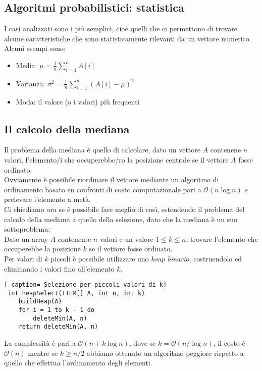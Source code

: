\documentclass[../cheatSheetAlgoritmi.tex]{subfiles}
\begin{document}
\subsection{Algoritmi probabilistici: statistica}
I casi analizzati sono i più semplici, cioè quelli che ci permettono di trovare alcune caratteristiche che sono statisticamente rilevanti da un vettore numerico. \\
Alcuni esempi sono:
\begin{itemize}
	\item Media: $\mu = \frac{1}{n} \sum_{i = 1}^{n} A[i]$
	\item Varianza: $\sigma^2 = \frac{1}{n} \sum_{i = 1}^{n} (A[i] - \mu)^2$
	\item Moda: il valore (o i valori) più frequenti
\end{itemize} 
\subsection{Il calcolo della mediana}
Il problema della mediana è quello di calcolare, dato un vettore $A$ contenene $n$ valori, l'elemento/i che occuperebbe/ro la posizione centrale se il vettore $A$ fosse ordinato. \\
Ovviamente è possibile riordinare il vettore mediante un algoritmo di ordinamento basato su confronti di costo computazionale pari a $\mathcal{O}(n \log n)$ e prelevare l'elemento a metà. \\
Ci chiediamo ora se è possibile fare meglio di così, estendendo il problema del calcolo della mediana a quello della selezione, dato che la mediana è un suo sottoproblema: \\
Dato un array $A$ contenente $n$ valori e un valore $1 \leq k \leq n$, trovare l'elemento che occuperebbe la posizione $k$ se il vettore fosse ordinato. \\
Per valori di $k$ piccoli è possibile utilizzare uno \emph{heap binario}, costruendolo ed eliminando i valori fino all'elemento $k$.
 \begin{lstlisting}[ caption= Selezione per piccoli valori di k]
 int heapSelect(ITEM[] A, int n, int k)
	buildHeap(A)
	for i = 1 to k - 1 do
		deleteMin(A, n)
	return deleteMin(A, n) 	
\end{lstlisting}
La complessità è pari a $\mathcal{O}(n + k \log n)$, dove se $k = \mathcal{O}(n / \log n)$, il costo è $\mathcal{O}(n)$ mentre se $k \geq n/2$ abbiamo ottenuto un algoritmo peggiore rispetto a quello che effettua l'ordinamento degli elementi. \\
\end{document}
